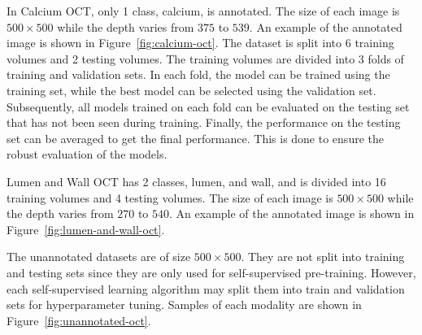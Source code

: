 \documentclass[a4paper,11pt,oneside]{report}
\begin{document}
In Calcium OCT, only 1 class, calcium, is annotated. The size of each image is $500\times 500$ while the depth varies from $375$ to $539$. An example of the annotated image is shown in Figure~\ref{fig:calcium-oct}. The dataset is split into 6 training volumes and 2 testing volumes. The training volumes are divided into 3 folds of training and validation sets. In each fold, the model can be trained using the training set, while the best model can be selected using the validation set. Subsequently, all models trained on each fold can be evaluated on the testing set that has not been seen during training. Finally, the performance on the testing set can be averaged to get the final performance. This is done to ensure the robust evaluation of the models.

Lumen and Wall OCT has 2 classes, lumen, and wall, and is divided into 16 training volumes and 4 testing volumes. The size of each image is $500\times 500$ while the depth varies from $270$ to $540$. An example of the annotated image is shown in Figure~\ref{fig:lumen-and-wall-oct}.



The unannotated datasets are of size $500\times 500$. They are not split into training and testing sets since they are only used for self-supervised pre-training. However, each self-supervised learning algorithm may split them into train and validation sets for hyperparameter tuning. Samples of each modality are shown in Figure~\ref{fig:unannotated-oct}. 
\end{document}
